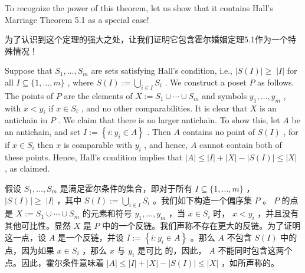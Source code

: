 \documentclass[10pt]{article}
\begin{document}
To recognize the power of this theorem, let us show that it contains Hall's Marriage Theorem 5.1 as a special case!

\begin{tcolorbox}\relax
为了认识到这个定理的强大之处，让我们证明它包含霍尔婚姻定理5.1作为一个特殊情况！
\end{tcolorbox}

Suppose that \({S}_{1},\ldots ,{S}_{m}\) are sets satisfying Hall’s condition, i.e., \(\left| {S\left( I\right) }\right|  \geq \; \left| I\right|\) for all \(I \subseteq  \{ 1,\ldots ,m\}\) , where \(S\left( I\right)  \mathrel{\text{ := }} \mathop{\bigcup }\limits_{{i \in  I}}{S}_{i}\) . We construct a poset \(P\) as follows. The points of \(P\) are the elements of \(X \mathrel{\text{ := }} {S}_{1} \cup  \cdots  \cup  {S}_{m}\) and symbols \({y}_{1},\ldots ,{y}_{m}\) , with \(x < {y}_{i}\) if \(x \in  {S}_{i}\) , and no other comparabilities. It is clear that \(X\) is an antichain in \(P\) . We claim that there is no larger antichain. To show this, let \(A\) be an antichain, and set \(I \mathrel{\text{ := }} \left\{  {i : {y}_{i} \in  A}\right\}\) . Then \(A\) contains no point of \(S\left( I\right)\) , for if \(x \in  {S}_{i}\) then \(x\) is comparable with \({y}_{i}\) , and hence, \(A\) cannot contain both of these points. Hence, Hall’s condition implies that \(\left| A\right|  \leq  \left| I\right|  + \left| X\right|  - \left| {S\left( I\right) }\right|  \leq  \left| X\right|\) , as claimed.

\begin{tcolorbox}\relax
假设 \({S}_{1},\ldots ,{S}_{m}\) 是满足霍尔条件的集合，即对于所有 \(I \subseteq  \{ 1,\ldots ,m\}\) ， \(\left| {S\left( I\right) }\right|  \geq \; \left| I\right|\) ，其中 \(S\left( I\right)  \mathrel{\text{ := }} \mathop{\bigcup }\limits_{{i \in  I}}{S}_{i}\) 。我们如下构造一个偏序集 \(P\) 。 \(P\) 的点是 \(X \mathrel{\text{ := }} {S}_{1} \cup  \cdots  \cup  {S}_{m}\) 的元素和符号 \({y}_{1},\ldots ,{y}_{m}\) ，当 \(x \in  {S}_{i}\) 时， \(x < {y}_{i}\) ，并且没有其他可比性。显然 \(X\) 是 \(P\) 中的一个反链。我们声称不存在更大的反链。为了证明这一点，设 \(A\) 是一个反链，并设 \(I \mathrel{\text{ := }} \left\{  {i : {y}_{i} \in  A}\right\}\) 。那么 \(A\) 不包含 \(S\left( I\right)\) 中的点，因为如果 \(x \in  {S}_{i}\) ，那么 \(x\) 与 \({y}_{i}\) 是可比 的，因此， \(A\) 不能同时包含这两个点。因此，霍尔条件意味着 \(\left| A\right|  \leq  \left| I\right|  + \left| X\right|  - \left| {S\left( I\right) }\right|  \leq  \left| X\right|\) ，如所声称的。
\end{tcolorbox}
\end{document}

